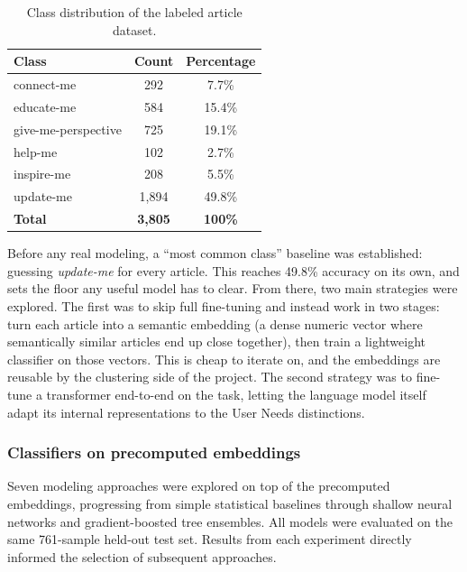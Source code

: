 \documentclass[11pt]{article}
\begin{document}
\begin{table}[H]
    \centering
    \begin{tabular}{lcc}
        \hline
        Class & Count & Percentage \\
        \hline
        connect-me & 292 & 7.7\% \\
        educate-me & 584 & 15.4\% \\
        give-me-perspective & 725 & 19.1\% \\
        help-me & 102 & 2.7\% \\
        inspire-me & 208 & 5.5\% \\
        update-me & 1{,}894 & 49.8\% \\
        \hline
        \textbf{Total} & \textbf{3{,}805} & \textbf{100\%} \\
        \hline
    \end{tabular}
    \caption{Class distribution of the labeled article dataset.}
    \label{tab:class_distribution}
\end{table}
 
\noindent Before any real modeling, a ``most common class'' baseline was established: guessing \textit{update-me} for every article. This reaches 49.8\% accuracy on its own, and sets the floor any useful model has to clear. From there, two main strategies were explored. The first was to skip full fine-tuning and instead work in two stages: turn each article into a semantic embedding (a dense numeric vector where semantically similar articles end up close together), then train a lightweight classifier on those vectors. This is cheap to iterate on, and the embeddings are reusable by the clustering side of the project. The second strategy was to fine-tune a transformer end-to-end on the task, letting the language model itself adapt its internal representations to the User Needs distinctions.
 

 
\subsubsection{Classifiers on precomputed embeddings}
 
Seven modeling approaches were explored on top of the precomputed embeddings, progressing from simple statistical baselines through shallow neural networks and gradient-boosted tree ensembles. All models were evaluated on the same 761-sample held-out test set. Results from each experiment directly informed the selection of subsequent approaches.
 
\end{document}
